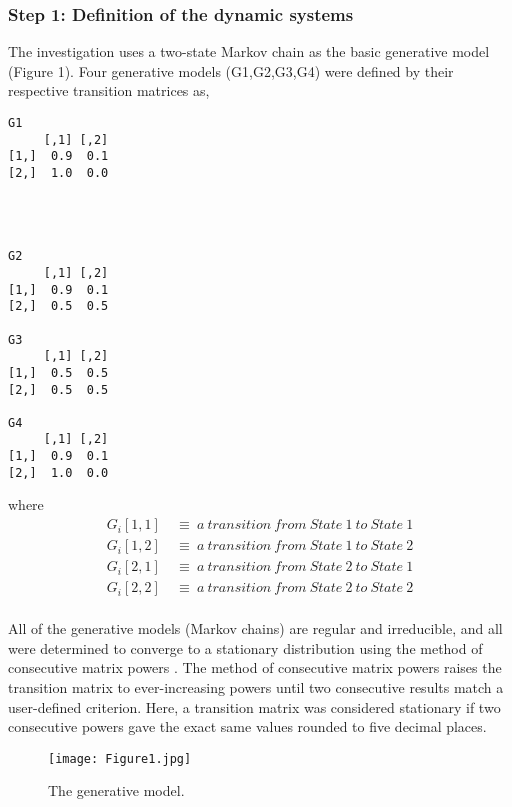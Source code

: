 \documentclass[letter,11pt]{article}
\begin{document}
\subsubsection{Step 1: Definition of the dynamic systems}
The investigation uses a two-state Markov chain as the basic generative model (Figure 1). Four generative models (G1,G2,G3,G4) were defined by their respective transition matrices as,
\begin{verbatim}
G1
     [,1] [,2]
[1,]  0.9  0.1
[2,]  1.0  0.0




G2
     [,1] [,2]
[1,]  0.9  0.1
[2,]  0.5  0.5

G3
     [,1] [,2]
[1,]  0.5  0.5
[2,]  0.5  0.5

G4
     [,1] [,2]
[1,]  0.9  0.1
[2,]  1.0  0.0
\end{verbatim} 
where
\begin{align*}
 G_{i}[1,1] \ &\equiv \ a \ transition \ from \ State \ 1 \ to \ State \ 1\\
 G_{i}[1,2] \ &\equiv \ a \ transition \ from \ State \ 1 \ to \ State \ 2\\
 G_{i}[2,1] \ &\equiv \ a \ transition \ from \ State \ 2 \ to \ State \ 1\\
 G_{i}[2,2] \ &\equiv \ a \ transition \ from \ State \ 2 \ to \ State \ 2\\
 \end{align*}
 
All of the generative models (Markov chains) are regular and irreducible, and all were determined to converge to a stationary distribution using the method of consecutive matrix powers \cite{luenberger_introduction_1979}. The method of consecutive matrix powers raises the transition matrix to ever-increasing powers until two consecutive results match a user-defined criterion. Here, a transition matrix was considered stationary if two consecutive powers gave the exact same values rounded to five decimal places. 
 \begin{figure}[H]
  \begin{center}
    \texttt{[image: Figure1.jpg]}
    \label{fig:}
    \caption{The generative model.}
  \end{center}
\end{figure}
\end{document}

